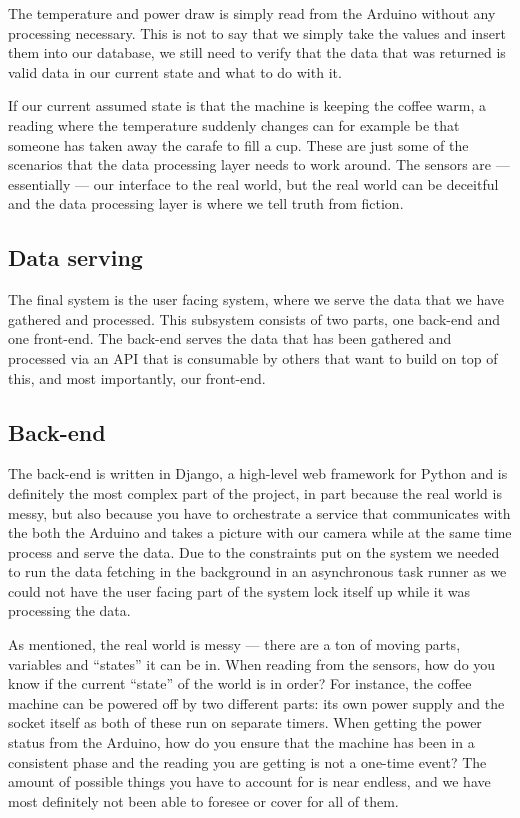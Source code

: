 \documentclass[12pt,a4paper,oneside,article]{memoir}
\numberwithin{equation}{chapter}
\begin{document}
The temperature and power draw is simply read from the Arduino without any
processing necessary. This is not to say that we simply take the values and
insert them into our database, we still need to verify that the data that was
returned is valid data in our current state and what to do with it.

If our current assumed state is that the machine is keeping the coffee warm, a
reading where the temperature suddenly changes can for example be that someone
has taken away the carafe to fill a cup. These are just some of the scenarios
that the data processing layer needs to work around. The sensors are ---
essentially --- our interface to the real world, but the real world can be
deceitful and the data processing layer is where we tell truth from fiction.

\subsection{Data serving}\label{sec:data-serving}
The final system is the user facing system, where we serve the data that we have
gathered and processed. This subsystem consists of two parts, one back-end and
one front-end. The back-end serves the data that has been gathered and processed
via an API that is consumable by others that want to build on top of this, and
most importantly, our front-end.

\subsection{Back-end}\label{sec:back-end}
The back-end is written in Django, a high-level web framework for Python and is
definitely the most complex part of the project, in part because the real world
is messy, but also because you have to orchestrate a service that communicates
with the both the Arduino and takes a picture with our camera while at the same
time process and serve the data. Due to the constraints put on the system we
needed to run the data fetching in the background in an asynchronous task
runner as we could not have the user facing part of the system lock itself up
while it was processing the data.

As mentioned, the real world is messy --- there are a ton of moving parts,
variables and ``states'' it can be in. When reading from the sensors, how do you
know if the current ``state'' of the world is in order? For instance, the coffee
machine can be powered off by two different parts: its own power supply and the
socket itself as both of these run on separate timers. When getting the power
status from the Arduino, how do you ensure that the machine has been in a
consistent phase and the reading you are getting is not a one-time event? The
amount of possible things you have to account for is near endless, and we have
most definitely not been able to foresee or cover for all of them.
\end{document}
